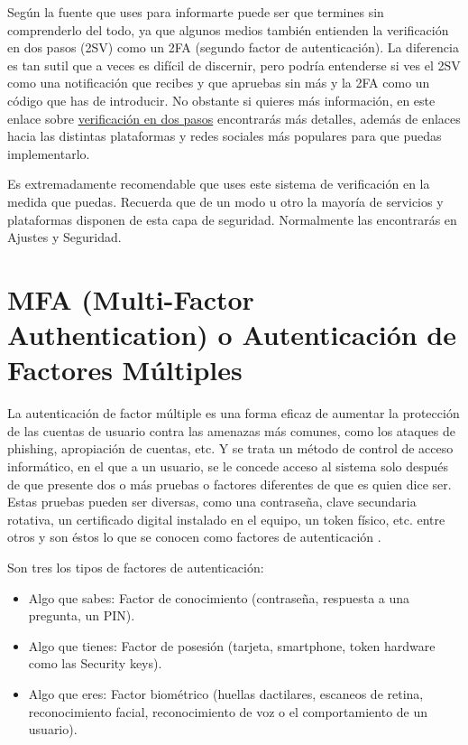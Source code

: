 \documentclass[
  spanish,
  a4paper,
  openany]{book}
\begin{document}
Según la fuente que uses para informarte puede ser que termines sin comprenderlo del todo, ya que algunos medios también entienden la verificación en dos pasos (2SV) como un 2FA (segundo factor de autenticación). La diferencia es tan sutil que a veces es difícil de discernir, pero podría entenderse si ves el 2SV como una notificación que recibes y que apruebas sin más y la 2FA como un código que has de introducir. No obstante si quieres más información, en este enlace sobre \href{https://www.osi.es/es/actualidad/blog/2017/01/17/verificacion-en-dos-pasos-que-es-y-como-me-puede-ayudar}{verificación en dos pasos} encontrarás más detalles, además de enlaces hacia las distintas plataformas y redes sociales más populares para que puedas implementarlo.

Es extremadamente recomendable que uses este sistema de verificación en la medida que puedas. Recuerda que de un modo u otro la mayoría de servicios y plataformas disponen de esta capa de seguridad. Normalmente las encontrarás en Ajustes y Seguridad.

\section{MFA (Multi-Factor Authentication) o Autenticación de Factores Múltiples}\label{mfa-multi-factor-authentication-o-autenticaciuxf3n-de-factores-muxfaltiples}

La autenticación de factor múltiple es una forma eficaz de aumentar la protección de las cuentas de usuario contra las amenazas más comunes, como los ataques de phishing, apropiación de cuentas, etc. Y se trata un método de control de acceso informático, en el que a un usuario, se le concede acceso al sistema solo después de que presente dos o más pruebas o factores diferentes de que es quien dice ser. Estas pruebas pueden ser diversas, como una contraseña, clave secundaria rotativa, un certificado digital instalado en el equipo, un token físico, etc. entre otros y son éstos lo que se conocen como factores de autenticación \citep{WIKI-multiple-factor}.

Son tres los tipos de factores de autenticación:

\begin{itemize}
\item
  Algo que sabes: Factor de conocimiento (contraseña, respuesta a una pregunta, un PIN).
\item
  Algo que tienes: Factor de posesión (tarjeta, smartphone, token hardware como las Security keys).
\item
  Algo que eres: Factor biométrico (huellas dactilares, escaneos de retina, reconocimiento facial, reconocimiento de voz o el comportamiento de un usuario).
\end{itemize}
\end{document}
